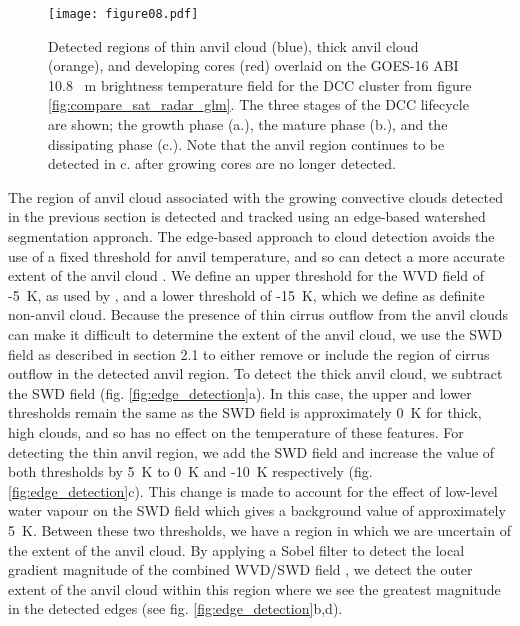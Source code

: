 \begin{figure}[t]
    \texttt{[image: figure08.pdf]}
    \caption{Detected regions of thin anvil cloud (blue), thick anvil cloud (orange), and developing cores (red) overlaid on the GOES-16 ABI 10.8 \unit{\mu m} brightness temperature field for the DCC cluster from figure \ref{fig:compare_sat_radar_glm}. The three stages of the DCC lifecycle are shown; the growth phase (a.), the mature phase (b.), and the dissipating phase (c.). Note that the anvil region continues to be detected in c. after growing cores are no longer detected.}
    \label{fig:detected_anvils}
\end{figure}

The region of anvil cloud associated with the growing convective clouds detected in the previous section is detected and tracked using an edge-based watershed segmentation approach.
The edge-based approach to cloud detection avoids the use of a fixed threshold for anvil temperature, and so can detect a more accurate extent of the anvil cloud \citep{dim_alternative_2013}.
We define an upper threshold for the WVD field of -5~\unit{K}, as used by \citet{muller_role_2018}, and a lower threshold of -15~\unit{K}, which we define as definite non-anvil cloud.
Because the presence of thin cirrus outflow from the anvil clouds can make it difficult to determine the extent of the anvil cloud, we use the SWD field as described in section 2.1 to either remove or include the region of cirrus outflow in the detected anvil region.
To detect the thick anvil cloud, we subtract the SWD field (fig. \ref{fig:edge_detection}a).
In this case, the upper and lower thresholds remain the same as the SWD field is approximately 0~K for thick, high clouds, and so has no effect on the temperature of these features.
For detecting the thin anvil region, we add the SWD field and increase the value of both thresholds by 5~K to 0~K and -10~K respectively (fig. \ref{fig:edge_detection}c).
This change is made to account for the effect of low-level water vapour on the SWD field which gives a background value of approximately 5~K.
Between these two thresholds, we have a region in which we are uncertain of the extent of the anvil cloud.
By applying a Sobel filter to detect the local gradient magnitude of the combined WVD/SWD field \citep{sobel_isotropic_2014}, we detect the outer extent of the anvil cloud within this region where we see the greatest magnitude in the detected edges (see fig. \ref{fig:edge_detection}b,d).


